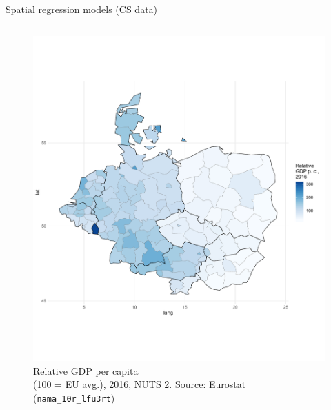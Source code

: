 \documentclass{beamer}
\begin{document}
\begin{frame}{Spatial regression models (CS data)}
\begin{columns}[T]
\begin{column}{.48\textwidth}
\begin{figure}
  \includegraphics[trim=0cm 3cm 1cm 2cm, clip=true, width=1\textwidth]{IMG/sp_GDP_Choropleth.pdf}\vspace{-0.4cm}\tiny{{\caption{Relative GDP per capita \\ (100 = EU avg.), 2016, NUTS 2. Source: Eurostat (\texttt{nama\_10r\_lfu3rt})}}}
\end{figure}
\end{column}
\end{columns}
\end{frame}
\end{document}
